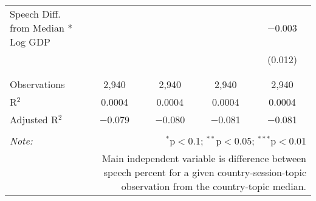 \begin{table}[!htbp]
\begin{tabular}{@{\extracolsep{5pt}}lcccc}
 Speech Diff. from Median * Log GDP &  &  &  & $-$0.003 \\ 
  &  &  &  & (0.012) \\ 
  & & & & \\ 
\hline \\[-1.8ex] 
Observations & 2,940 & 2,940 & 2,940 & 2,940 \\ 
R$^{2}$ & 0.0004 & 0.0004 & 0.0004 & 0.0004 \\ 
Adjusted R$^{2}$ & $-$0.079 & $-$0.080 & $-$0.081 & $-$0.081 \\ 
\hline 
\hline \\[-1.8ex] 
\textit{Note:}  & \multicolumn{4}{r}{$^{*}$p$<$0.1; $^{**}$p$<$0.05; $^{***}$p$<$0.01} \\ 
 & \multicolumn{4}{r}{Main independent variable is difference between speech percent for a given country-session-topic observation from the country-topic median.} \\ 
\end{tabular} 
\end{table} 
